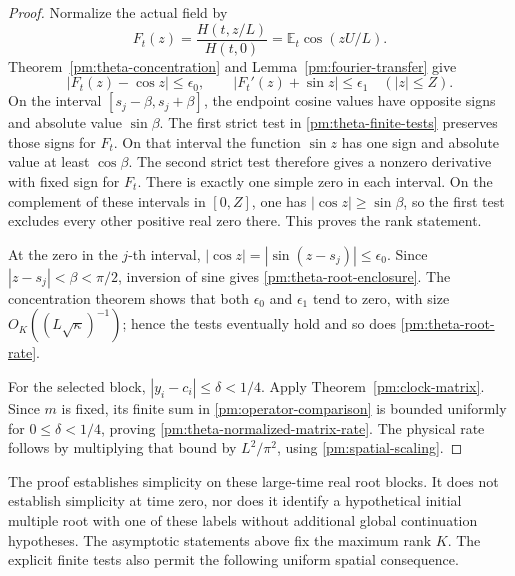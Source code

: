 \begin{proof}
Normalize the actual field by
\[
 F_t(z)=\frac{H(t,z/L)}{H(t,0)}=\mathbb E_t\cos(zU/L).
\]
Theorem~\ref{pm:theta-concentration} and
Lemma~\ref{pm:fourier-transfer} give
\[
 |F_t(z)-\cos z|\le\epsilon_0,
 \qquad |F_t'(z)+\sin z|\le\epsilon_1
                     \quad(|z|\le Z).
\]
On the interval \([s_j-\beta,s_j+\beta]\), the endpoint cosine
values have opposite signs and absolute value \(\sin\beta\).
The first strict test in \eqref{pm:theta-finite-tests} preserves those
signs for \(F_t\).  On that interval the function \(\sin z\) has
one sign and absolute value at least \(\cos\beta\).  The second
strict test therefore gives a nonzero derivative with fixed sign for
\(F_t\).  There is exactly one simple zero in each interval.
On the complement of these intervals in \([0,Z]\), one has
\(|\cos z|\ge\sin\beta\), so the first test excludes every other
positive real zero there.  This proves the rank statement.

At the zero in the \(j\)-th interval,
\(|\cos z|=|\sin(z-s_j)|\le\epsilon_0\).  Since
\(|z-s_j|<\beta<\pi/2\), inversion of sine gives
\eqref{pm:theta-root-enclosure}.  The concentration theorem shows that
both \(\epsilon_0\) and \(\epsilon_1\) tend to zero, with size
\(O_K((L\sqrt\kappa)^{-1})\); hence the tests eventually hold and
so does \eqref{pm:theta-root-rate}.

For the selected block, \(|y_i-c_i|\le\delta<1/4\).  Apply
Theorem~\ref{pm:clock-matrix}.  Since \(m\) is fixed, its finite sum
in \eqref{pm:operator-comparison} is bounded uniformly for
\(0\le\delta<1/4\), proving
\eqref{pm:theta-normalized-matrix-rate}.  The physical rate follows
by multiplying that bound by \(L^2/\pi^2\), using
\eqref{pm:spatial-scaling}.
\end{proof}

The proof establishes simplicity on these large-time real root blocks.
It does not establish simplicity at time zero, nor does it identify a
hypothetical initial multiple root with one of these labels without
additional global continuation hypotheses.  The asymptotic statements
above fix the maximum rank \(K\).  The explicit finite tests also permit
the following uniform spatial consequence.

